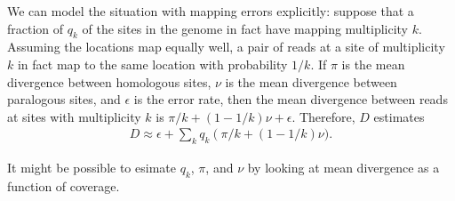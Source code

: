 \documentclass{article}
\begin{document}
We can model the situation with mapping errors explicitly:
suppose that a fraction of $q_k$ of the sites in the genome
in fact have mapping multiplicity $k$.
Assuming the locations map equally well,
a pair of reads at a site of multiplicity $k$ 
in fact map to the same location with probability $1/k$.
If $\pi$ is the mean divergence between homologous sites,
$\nu$ is the mean divergence between paralogous sites,
and $\epsilon$ is the error rate,
then the mean divergence between reads at sites with multiplicity $k$ 
is $\pi/k + (1-1/k) \nu + \epsilon$.
Therefore, $D$ estimates
\begin{align}
  D \approx \epsilon + \sum_k q_k \left( \pi/k + (1-1/k) \nu ) .
\end{align}

It might be possible to esimate $q_k$, $\pi$, and $\nu$ by looking at mean divergence as a function of coverage.
\end{document}
